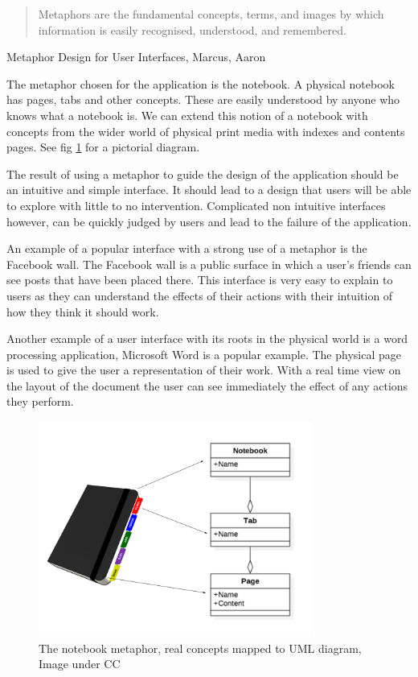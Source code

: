 \blockquote{%
  Metaphors are the fundamental concepts, terms, and images by which information
  is easily recognised, understood, and remembered.%
}

Metaphor Design for User Interfaces, Marcus, Aaron\cite{Marcus:1998:MDU:286498.286577}

The metaphor chosen for the application is the notebook. A physical
notebook has pages, tabs and other concepts. These are easily understood by
anyone who knows what a notebook is. We can extend this notion of a
notebook with concepts from the wider world of physical print media with indexes and
contents pages. See fig \ref{fig:notebookmetaphor} for a pictorial diagram.

The result of using a metaphor to guide the design of the application should be
an intuitive and simple interface. It should lead to a design that users will be able to
explore with little to no intervention. Complicated non intuitive interfaces however, 
can be quickly judged by users and lead to the failure of the application.

An example of a popular interface with a strong use of a metaphor is the 
Facebook wall. The Facebook wall is a public surface in which a user's friends 
can see posts that have been placed there. This interface is very easy to explain
to users as they can understand the effects of their actions with their intuition
of how they think it should work.

Another example of a user interface with its roots in the physical world is a
word processing application, Microsoft Word is a popular example. The physical page
is used to give the user a representation of their work. With a real time view
on the layout of the document the user can see immediately the effect of any 
actions they perform.



\begin{figure}
  \includegraphics[width=0.8\textwidth]{Figures/NotebookMetaphor.png}
  \caption{The notebook metaphor, real concepts mapped to UML diagram, Image under CC}
  \label{fig:notebookmetaphor}
\end{figure}



